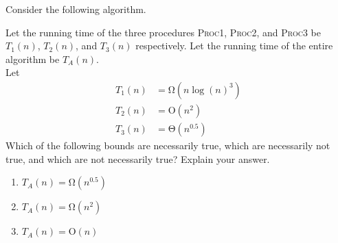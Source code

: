 \documentclass[fleqn, a4paper, 11pt, oneside]{amsart}
\theoremstyle{definition}
\theoremstyle{theorem}
\begin{document}
\begin{question}
	Consider the following algorithm.
	\begin{algorithm}
		\begin{algorithmic}[1]
			\EndProcedure
		\end{algorithmic}
	\end{algorithm}
	Let the running time of the three procedures \textsc{Proc1}, \textsc{Proc2}, and \textsc{Proc3} be $T_1(n)$, $T_2(n)$, and $T_3(n)$ respectively.
	Let the running time of the entire algorithm be $T_A(n)$.\\
	Let
	\begin{align*}
		T_1(n) & = \mathrm{\Omega}\left( n \log(n)^3 \right) \\
		T_2(n) & = \mathrm{O}\left( n^2 \right)              \\
		T_3(n) & = \mathrm{\Theta}\left( n^{0.5} \right)
	\end{align*}
	Which of the following bounds are necessarily true, which are necessarily not true, and which are not necessarily true?
	Explain your answer.
	\begin{enumerate}
		\item $T_A(n) = \mathrm{\Omega}\left( n^{0.5} \right)$
		\item $T_A(n) = \mathrm{\Omega}\left( n^2 \right)$
		\item $T_A(n) = \mathrm{O}(n)$
	\end{enumerate}
\end{question}
\end{document}
